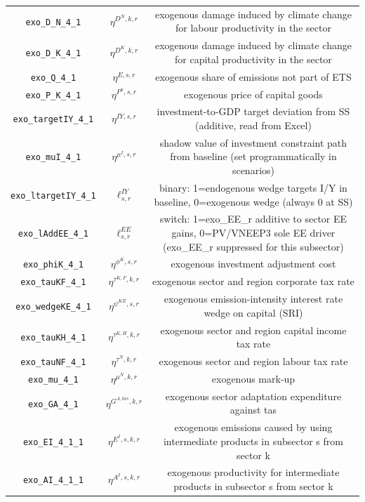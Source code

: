 \begin{center}
\begin{longtable}{ccc}
\texttt{exo\_D\_N\_4\_1} & ${\eta^{D^{N},k,r}}$ & exogenous damage induced by climate change for labour productivity in the sector\\
\texttt{exo\_D\_K\_4\_1} & ${\eta^{D^{K},k,r}}$ & exogenous damage induced by climate change for capital productivity in the sector\\
\texttt{exo\_Q\_4\_1} & ${\eta^{E,s,r}}$ & exogenous share of emissions not part of ETS\\
\texttt{exo\_P\_K\_4\_1} & ${\eta^{P^k,s,r}}$ & exogenous price of capital goods\\
\texttt{exo\_targetIY\_4\_1} & ${\eta^{IY,s,r}}$ & investment-to-GDP target deviation from SS (additive, read from Excel)\\
\texttt{exo\_muI\_4\_1} & ${\eta^{\mu^{I},s,r}}$ & shadow value of investment constraint path from baseline (set programmatically in scenarios)\\
\texttt{exo\_ltargetIY\_4\_1} & ${\ell^{IY}_{s,r}}$ & binary: 1=endogenous wedge targets I/Y in baseline, 0=exogenous wedge (always 0 at SS)\\
\texttt{exo\_lAddEE\_4\_1} & ${\ell^{EE}_{s,r}}$ & switch: 1=exo\_EE\_r additive to sector EE gains, 0=PV/VNEEP3 sole EE driver (exo\_EE\_r suppressed for this subsector)\\
\texttt{exo\_phiK\_4\_1} & ${\eta^{\phi^{K},{s,r}}}$ & exogenous investment adjustment cost\\
\texttt{exo\_tauKF\_4\_1} & ${\eta^{\tau^{K,F},k,r}}$ & exogenous sector and region corporate tax rate\\
\texttt{exo\_wedgeKE\_4\_1} & ${\eta^{\psi^{KE},s,r}}$ & exogenous emission-intensity interest rate wedge on capital (SRI)\\
\texttt{exo\_tauKH\_4\_1} & ${\eta^{\tau^{K,H},k,r}}$ & exogenous sector and region capital income tax rate\\
\texttt{exo\_tauNF\_4\_1} & ${\eta^{\tau^{N},k,r}}$ & exogenous sector and region labour tax rate\\
\texttt{exo\_mu\_4\_1} & ${\eta^{\mu^{N},k,r}}$ & exogenous mark-up\\
\texttt{exo\_GA\_4\_1} & ${\eta^{G^{A,tas},k,r}}$ & exogenous sector adaptation expenditure against tas\\
\texttt{exo\_EI\_4\_1\_1} & ${\eta^{E^{I},s,k,r}}$ & exogenous emissions caused by using intermediate products in subsector s from sector k\\
\texttt{exo\_AI\_4\_1\_1} & ${\eta^{A^{I},s,k,r}}$ & exogenous productivity for intermediate products in subsector s from sector k\\

\end{longtable}
\end{center}
